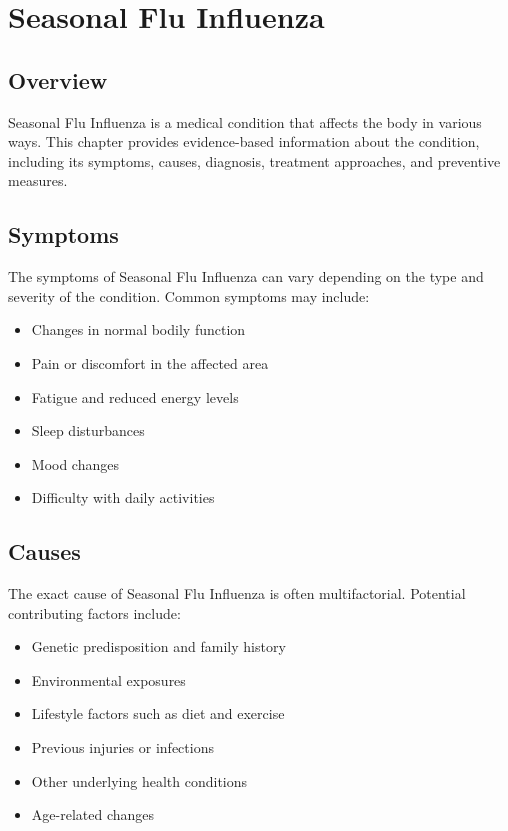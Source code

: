 \chapter{Seasonal Flu Influenza}

\section*{Overview}
Seasonal Flu Influenza is a medical condition that affects the body in various ways. This chapter provides evidence-based information about the condition, including its symptoms, causes, diagnosis, treatment approaches, and preventive measures.

\section*{Symptoms}
The symptoms of Seasonal Flu Influenza can vary depending on the type and severity of the condition. Common symptoms may include:

\begin{itemize}
\item Changes in normal bodily function
\item Pain or discomfort in the affected area
\item Fatigue and reduced energy levels
\item Sleep disturbances
\item Mood changes
\item Difficulty with daily activities
\end{itemize}

\section*{Causes}
The exact cause of Seasonal Flu Influenza is often multifactorial. Potential contributing factors include:

\begin{itemize}
\item Genetic predisposition and family history
\item Environmental exposures
\item Lifestyle factors such as diet and exercise
\item Previous injuries or infections
\item Other underlying health conditions
\item Age-related changes
\end{itemize}

